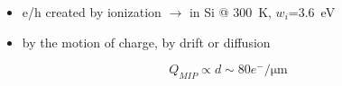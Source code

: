 \begin{frame}
\begin{itemize}
                \item e/h created by ionization $\rightarrow$ in Si @ \SI{300}{K}, $w_{i}$=\SI{3.6}{eV}
                \item by the motion of charge, by drift or diffusion  
            \end{itemize}
            \bigskip
            \begin{equation*}%
                Q_{MIP}\propto d \sim 80 e^-/\si{\um}
            \end{equation*} 


    \end{frame} 


